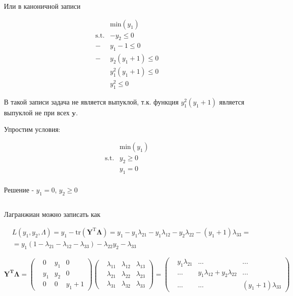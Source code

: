 	Или в каноничной записи
	
	 \begin{equation}
	 \begin{split}
	 &\text{min}( y_1)\\
	 \text{s.t.}&-y_2 \leqslant 0\\
	 -&y_1-1 \leqslant 0\\
	 -&y_2(y_1+1) \leqslant 0\\
	 &y_1^2(y_1+1) \leqslant 0\\
	 &y_1^2 \leqslant 0
	 \end{split}
	 \end{equation}
	 
	В такой записи задача не является выпуклой, т.к. функция $y_1^2(y_1+1)$ является выпуклой не при всех $\mathbf{y}$.
	 
	Упростим условия:
	
	\begin{equation}
	\begin{split}
	&\text{min} (y_1)\\
	\text{s.t.}&y_2 \geqslant 0\\
	&y_1 = 0\\
	\end{split}
	\end{equation}
	
	Решение - $y_1 = 0$, $y_2 \geqslant 0$
	
	\subsection{}
		
	Лагранжиан можно записать как
	
	\begin{equation}
	\begin{split}
	&L(y_1,y_2, \Lambda) = y_1 - \text{tr}(\mathbf{Y}^{\text{T}}\mathbf{\Lambda}) = y_1 -  y_1\lambda_{21} - y_1\lambda_{12} - y_2\lambda_{22} - (y_1+1)\lambda_{33} =\\
	 & = y_1 (1 -  \lambda_{21} - \lambda_{12} - \lambda_{33} )- \lambda_{22} y_2 - \lambda_{33} 
	\end{split}
	\end{equation}
	
	$\mathbf{\mathbf{Y}^{\text{T}}\mathbf{\Lambda}} =\left( \begin{matrix}
	 & 0 & y_1 & 0 \\
	 & y_1 & y_2 & 0 \\
	 & 0 & 0 & y_1 +1 
	\end{matrix}\right) 
	\left( \begin{matrix}
	& \lambda_{11} & \lambda_{12} & \lambda_{13} \\
	& \lambda_{21} & \lambda_{22} & \lambda_{23} \\
	& \lambda_{31} & \lambda_{32} & \lambda_{33} 
	\end{matrix}\right) = 	
	\left( \begin{matrix}
	& y_1\lambda_{21} & ... & ... \\
	& ... & y_1\lambda_{12}+y_2\lambda_{22} & ... \\
	& ... & ... & (y_1+1)\lambda_{33} 
	\end{matrix}\right)  $
	
